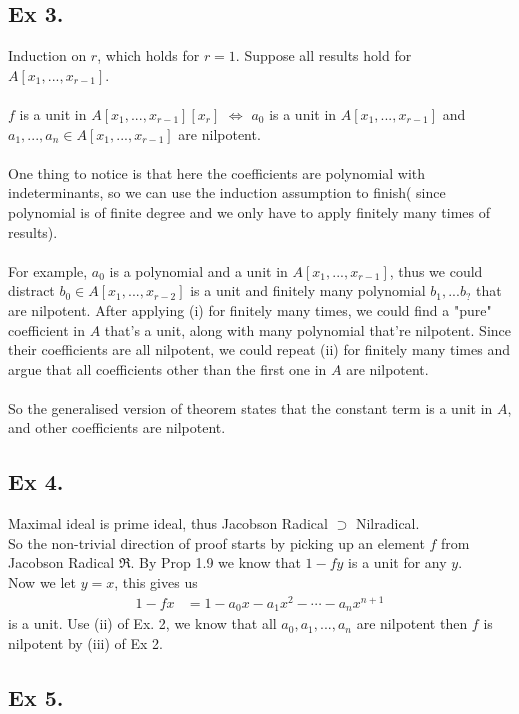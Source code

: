 \newpage\subsection{Ex 3.}
Induction on $r$, which holds for $r=1$. Suppose all results hold for $A[x_1,...,x_{r-1}]$.\\\\
$f$ is a unit in $A[x_1,...,x_{r-1}][x_r]$ $\Leftrightarrow$ $a_0$ is a unit in $A[x_1,...,x_{r-1}]$ and $a_1,...,a_n\in A[x_1,...,x_{r-1}]$ are nilpotent.\\\\
One thing to notice is that here the coefficients are polynomial with indeterminants, so we can use the induction assumption to finish( since polynomial is of finite degree and we only have to apply finitely many times of results).\\\\
For example, $a_0$ is a polynomial and a unit in $A[x_1,...,x_{r-1}]$, thus we could distract $b_0\in A[x_1,...,x_{r-2}]$ is a unit and finitely many polynomial $b_1,...b_{?}$ that are nilpotent.
After applying (i) for finitely many times, we could find a "pure" coefficient in $A$ that's a unit, along with many polynomial that're nilpotent. Since their coefficients are all nilpotent, we could repeat (ii) for finitely many times and argue that all coefficients other than the first one in $A$ are nilpotent.\\\\
So the generalised version of theorem states that the constant term is a unit in $A$, and other coefficients are nilpotent.

\subsection{Ex 4.}
Maximal ideal is prime ideal, thus Jacobson Radical $\supset $ Nilradical.\\
So the non-trivial direction of proof starts by picking up an element $f$ from Jacobson Radical $\mathfrak{R}$. 
By Prop 1.9 we know that $1-fy$ is a unit for any $y$.\\
Now we let $y=x$, this gives us
\begin{align*}
    1-fx&=1-a_0x-a_1x^2-\cdots-a_nx^{n+1}
\end{align*}is a unit. Use (ii) of Ex. 2, we know that all $a_0,a_1,...,a_n$ are nilpotent then $f$ is nilpotent by (iii) of Ex 2.


\subsection{Ex 5.} 

